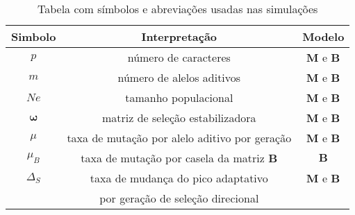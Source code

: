 \begin{table}[htbp]
    \caption[Tabela de abreviações]{Tabela com símbolos e abreviações
    usadas nas simulações}
    \label{tab:exemplo}
    \vspace{1em}
    \centering
    \begin{tabular}{c c c}
        \toprule
        Simbolo    & Interpretação & Modelo\\
        \midrule
        $p$        & número de caracteres & $\mathbf{M}$ e $\mathbf{B}$\\
        $m$        & número de alelos aditivos & $\mathbf{M}$ e $\mathbf{B}$\\
        $Ne$       & tamanho populacional & $\mathbf{M}$ e $\mathbf{B}$   \\
        $\pmb{\omega}$   & matriz de seleção estabilizadora & $\mathbf{M}$ e $\mathbf{B}$\\
        $\mu$      & taxa de mutação por alelo aditivo por geração & $\mathbf{M}$ e $\mathbf{B}$\\
        $\mu_B$    & taxa de mutação por casela da matriz $\mathbf{B}$ & $\mathbf{B}$\\
        $\Delta_S$ & taxa de mudança do pico adaptativo & $\mathbf{M}$ e $\mathbf{B}$\\
                   & por geração de seleção direcional & \\

        \bottomrule
    \end{tabular}
\end{table}

